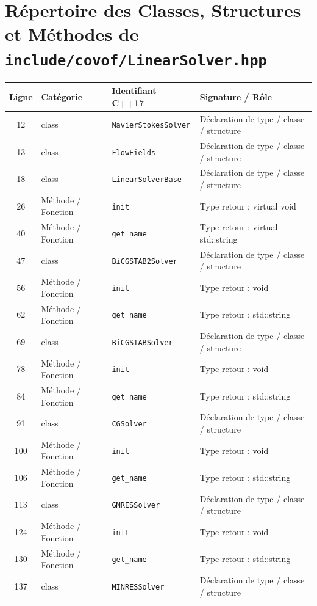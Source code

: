 \documentclass[10pt,a4paper,oneside]{book}
\begin{document}
\section{Répertoire des Classes, Structures et Méthodes de \texttt{include/covof/LinearSolver.hpp}}
\begin{center}\small
\begin{tabular}{clll}
\toprule
\textbf{Ligne} & \textbf{Catégorie} & \textbf{Identifiant C++17} & \textbf{Signature / Rôle} \\
\midrule
12 & class & \texttt{NavierStokesSolver} & Déclaration de type / classe / structure \\
13 & class & \texttt{FlowFields} & Déclaration de type / classe / structure \\
18 & class & \texttt{LinearSolverBase} & Déclaration de type / classe / structure \\
26 & Méthode / Fonction & \texttt{init} & Type retour : virtual void \\
40 & Méthode / Fonction & \texttt{get\_name} & Type retour : virtual std::string \\
47 & class & \texttt{BiCGSTAB2Solver} & Déclaration de type / classe / structure \\
56 & Méthode / Fonction & \texttt{init} & Type retour : void \\
62 & Méthode / Fonction & \texttt{get\_name} & Type retour : std::string \\
69 & class & \texttt{BiCGSTABSolver} & Déclaration de type / classe / structure \\
78 & Méthode / Fonction & \texttt{init} & Type retour : void \\
84 & Méthode / Fonction & \texttt{get\_name} & Type retour : std::string \\
91 & class & \texttt{CGSolver} & Déclaration de type / classe / structure \\
100 & Méthode / Fonction & \texttt{init} & Type retour : void \\
106 & Méthode / Fonction & \texttt{get\_name} & Type retour : std::string \\
113 & class & \texttt{GMRESSolver} & Déclaration de type / classe / structure \\
124 & Méthode / Fonction & \texttt{init} & Type retour : void \\
130 & Méthode / Fonction & \texttt{get\_name} & Type retour : std::string \\
137 & class & \texttt{MINRESSolver} & Déclaration de type / classe / structure \\

\end{tabular}
\end{center}
\end{document}
